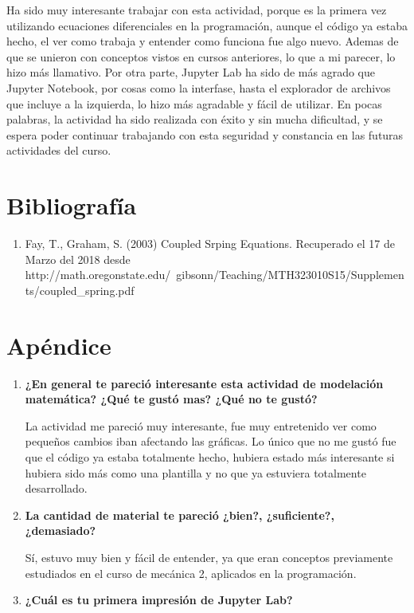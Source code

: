 \documentclass[a4paper]{article}
\begin{document}
\begin{center}
Ha sido muy interesante trabajar con esta actividad, porque es la primera vez utilizando ecuaciones diferenciales en la programación, aunque el código ya estaba hecho, el ver como trabaja y entender como funciona fue algo nuevo. Ademas de que se unieron con conceptos vistos en cursos anteriores, lo que a mi parecer, lo hizo más llamativo. Por otra parte, Jupyter Lab ha sido de más agrado que Jupyter Notebook, por cosas como la interfase, hasta el explorador de archivos que incluye a la izquierda, lo hizo más agradable y fácil de utilizar. En pocas palabras, la actividad ha sido realizada con éxito y sin mucha dificultad, y se espera poder continuar trabajando con esta seguridad y constancia en las futuras actividades del curso. 

\section{Bibliografía}
\begin{enumerate}
\item Fay, T., Graham, S. (2003) Coupled Srping Equations. Recuperado el 17 de Marzo del 2018 desde http://math.oregonstate.edu/~gibsonn/Teaching/MTH323\-010S15/Supplements/coupled\_spring.pdf

\end{enumerate}

\section{Apéndice}
\begin{enumerate}
\item \textbf{¿En general te pareció interesante esta actividad de modelación matemática? ¿Qué te gustó mas? ¿Qué no te gustó?}

La actividad me pareció muy interesante, fue muy entretenido ver como pequeños cambios iban afectando las gráficas. Lo único que no me gustó fue que el código ya estaba totalmente hecho, hubiera estado más interesante si hubiera sido más como una plantilla y no que ya estuviera totalmente desarrollado. 

\item \textbf{La cantidad de material te pareció ¿bien?, ¿suficiente?, ¿demasiado?}

Sí, estuvo muy bien y fácil de entender, ya que eran conceptos previamente estudiados en el curso de mecánica 2, aplicados en la programación.

\item \textbf{¿Cuál es tu primera impresión de Jupyter Lab?} 


\end{enumerate}
\end{center}
\end{document}
